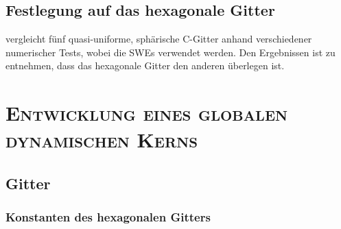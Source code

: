 \documentclass{book}
\begin{document}
\section{Festlegung auf das hexagonale Gitter}
\label{sec:festlegung_auf_das_hexagonale_gitter}

\cite{weller} vergleicht fünf quasi-uniforme, sphärische C-Gitter anhand verschiedener numerischer Tests, wobei die SWEs verwendet werden. Den Ergebnissen ist zu entnehmen, dass das hexagonale Gitter den anderen überlegen ist.

\chapter{\normalfont\textsc{Entwicklung eines globalen dynamischen Kerns}}
\label{chap:entwicklung_eines_globalen_dynamischen_kerns}

\section{Gitter}
\label{sec:gitter}

\subsection{Konstanten des hexagonalen Gitters}
\label{sec:konstanten_des_hexagonalen_gitters}
\end{document}
